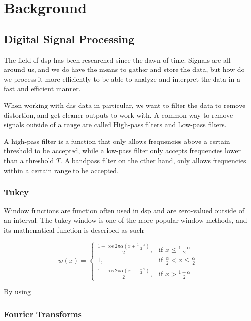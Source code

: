 \chapter{Background}
\label{chap:back}

\section{Digital Signal Processing}

The field of \acrfull{dsp} has been researched since the dawn of time. Signals are all around us, and we do have the means to gather and store the data, but how do we process it more efficiently to be able to analyze and interpret the data in a fast and efficient manner.

When working with \acrshort{das} data in particular, we want to filter the data to remove distortion, and get cleaner outputs to work with. A common way to remove signals outside of a range are called High-pass filters and Low-pass filters. 

A high-pass filter is a function that only allows frequencies above a certain threshold to be accepted, while a low-pass filter only accepts frequencies lower than a threshold $T$. A bandpass filter on the other hand, only allows frequencies within a certain range to be accepted. 

\subsection{Tukey}

Window functions are function often used in \acrshort{dsp} and are zero-valued outside of an interval. The tukey window is one of the more popular window methods, and its mathematical function is described as such: 

\[
    w(x)= 
\begin{cases}
    \frac{1 + \cos{2 \pi \alpha (x + \frac{1-\alpha}{2})}}{2}, & \text{if } x \leq \frac{1-\alpha}{2}\\
    1,              & \text{if } \frac{\alpha}{2} < x \leq \frac{\alpha}{2}\\
    \frac{1 + \cos{2 \pi \alpha (x - \frac{1-\alpha}{2})}}{2}, & \text{if } x > \frac{1-\alpha}{2}
\end{cases}
\]

By using 
\subsection{Fourier Transforms}